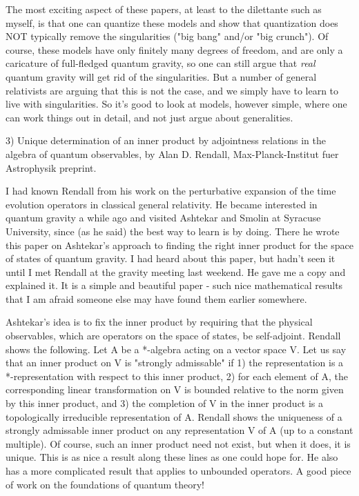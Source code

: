 The most exciting aspect of these papers, at least to the dilettante
such as myself, is that one can quantize these models and show that
quantization does NOT typically remove the singularities ("big bang"
and/or "big crunch").  Of course, these models have only finitely many
degrees of freedom, and are only a caricature of full-fledged quantum
gravity, so one can still argue that \emph{real} quantum gravity will get rid
of the singularities.  But a number of general relativists are arguing
that this is not the case, and we simply have to learn to live with
singularities.  So it's good to look at models, however simple, where one
can work things out in detail, and not just argue about generalities.

3)  Unique determination of an inner product by adjointness relations in
the algebra of quantum observables, by Alan D. Rendall,
Max-Planck-Institut fuer Astrophysik preprint.

I had known Rendall from his work on the perturbative expansion of the
time evolution operators in classical general relativity.  He became
interested in quantum gravity a while ago and visited Ashtekar and
Smolin at Syracuse University, since (as he said) the best way to learn
is by doing.  There he wrote this paper on Ashtekar's approach to
finding the right inner product for the space of states of quantum
gravity.   I had heard about this paper, but hadn't seen it until I met
Rendall at the gravity meeting last weekend.  He gave me a copy and
explained it.  It is a simple and beautiful paper - such nice
mathematical results that I am afraid someone else may have found
them earlier somewhere.  

Ashtekar's idea is to fix the inner product by requiring that the
physical observables, which are operators on the space of states, be
self-adjoint.  Rendall shows the following.  Let A be a *-algebra acting
on a vector space V.  Let us say that an inner product on V is "strongly
admissable" if 1) the representation is a *-representation with respect
to this inner product, 2) for each element of A, the corresponding
linear transformation on V is bounded relative to the norm given by this
inner product, and 3) the completion of V in the inner product is a
topologically irreducible representation of A.  Rendall shows the
uniqueness of a strongly admissable inner product on any representation
V of A (up to a constant multiple).  Of course, such an inner product
need not exist, but when it does, it is unique.  This is as nice a
result along these lines as one could hope for.  He also has a more
complicated result that applies to unbounded operators.  A good piece of
work on the foundations of quantum theory!

